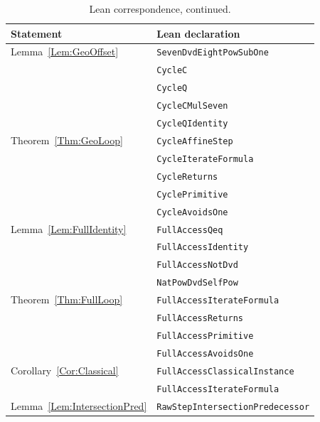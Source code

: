 \documentclass[11pt,letterpaper]{article}
\begin{document}
\begin{table}[htbp]
\centering
\begin{tabular}{ll}
\toprule
Statement & Lean declaration \\
\midrule
Lemma~\ref{Lem:GeoOffset} & \texttt{SevenDvdEightPowSubOne} \\
 & \texttt{CycleC} \\
 & \texttt{CycleQ} \\
 & \texttt{CycleCMulSeven} \\
 & \texttt{CycleQIdentity} \\
Theorem~\ref{Thm:GeoLoop} & \texttt{CycleAffineStep} \\
 & \texttt{CycleIterateFormula} \\
 & \texttt{CycleReturns} \\
 & \texttt{CyclePrimitive} \\
 & \texttt{CycleAvoidsOne} \\
Lemma~\ref{Lem:FullIdentity} & \texttt{FullAccessQeq} \\
 & \texttt{FullAccessIdentity} \\
 & \texttt{FullAccessNotDvd} \\
 & \texttt{NatPowDvdSelfPow} \\
Theorem~\ref{Thm:FullLoop} & \texttt{FullAccessIterateFormula} \\
 & \texttt{FullAccessReturns} \\
 & \texttt{FullAccessPrimitive} \\
 & \texttt{FullAccessAvoidsOne} \\
Corollary~\ref{Cor:Classical} & \texttt{FullAccessClassicalInstance} \\
 & \texttt{FullAccessIterateFormula} \\
Lemma~\ref{Lem:IntersectionPred} & \texttt{RawStepIntersectionPredecessor} \\
\bottomrule
\end{tabular}
\caption{Lean correspondence, continued.}
\end{table}
\end{document}
